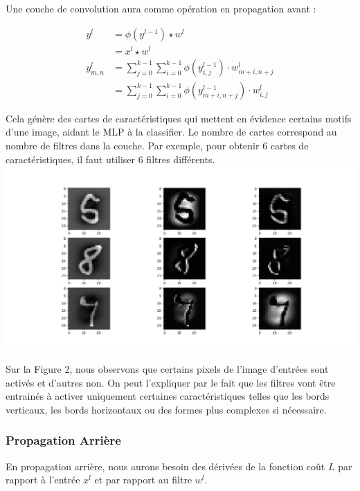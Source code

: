 \begin{multicols}{2}
Une couche de convolution aura comme opération
en propagation avant : 

\begin{align}
y^{l} &= \phi (y^{l-1})\star w^{l} \\
&=x^{l}\star w^{l} \\
y_{m,n}^{l} &= \sum_{j=0}^{k-1}\sum_{i=0}^{k-1}\phi(y_{i,j}^{l-1}) \cdot w_{m+i,n+j}^{l}\\
&= \sum_{j=0}^{k-1}\sum_{i=0}^{k-1}\phi(y_{m+i, n+j}^{l-1}) \cdot w_{i,j}^{l}
\end{align}

Cela génère des cartes de caractéristiques qui mettent en évidence certains 
motifs d’une image, aidant le MLP à la classifier. Le nombre de cartes 
correspond au nombre de filtres dans la couche. Par exemple, pour obtenir 6 cartes 
de caractéristiques, il faut utiliser 6 filtres différents.\\

\includegraphics[width=\columnwidth]{images/featuremaps.png}
\hfill\break

Sur la Figure 2, nous observons que certains pixels de l'image d'entrées sont
activés et d'autres non. On peut l'expliquer par le fait que les filtres 
vont être entrainés à activer uniquement certaines caractéristiques telles
que les bords verticaux, les bords horizontaux ou des formes plus complexes si nécessaire.\\


\subsubsection{Propagation Arrière}

En propagation arrière, nous aurons besoin des dérivées de la fonction coût $L$
par rapport à l'entrée $x^{l}$ et par rapport au filtre $w^{l}$.\\


\end{multicols}
